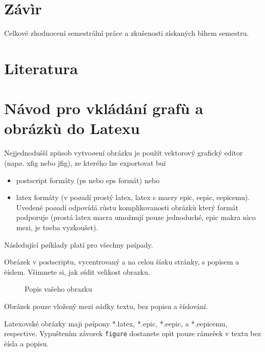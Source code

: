 \documentclass[12pt]{article}
\begin{document}
\section{Závìr}

Celkové zhodnocení semestrální práce a zkušenosti získaných bìhem
semestru.

\section{Literatura}

\appendix

\section{Návod pro vkládání grafù a obrázkù do Latexu}

Nejjednodušší zpùsob vytvoøení obrázku je použít vektorový grafický
editor (napø. xfig nebo jfig), ze kterého lze exportovat buï
\begin{itemize}
\item postscript formáty (ps nebo eps formát) nebo
\item latex formáty (v poøadí prostý latex, latex s macry epic, eepic, eepicemu). Uvedené poøadí odpovídá rùstu
komplikovanosti obrázkù který formát podporuje (prostá latex macra
umožnují pouze jednoduché, epic makra nìco mezi, je tøeba
vyzkoušet).

\end{itemize}
Následující pøíklady platí pro všechny pøípady.

Obrázek v postscriptu, vycentrovaný a na celou šíøku stránky, s
popisem a èíslem. Všimnete si, jak øídit velikost obrazku.
\begin{figure}[ht]
\epsfysize=3cm \centerline{} \caption{Popis
vašeho obrazku} \label{labelvasehoobrazku}
\end{figure}

Obrázek pouze vložený mezi øádky textu, bez popisu a èíslování.\\
\epsfxsize=1cm
\rule{0pt}{0pt}\hfill{}\hfill\rule{0pt}{0pt}

Latexovské obrázky maji pøípony *.latex, *.epic, *.eepic, a
*.eepicemu, respective.
%
Vypuštením závorek {\tt figure} dostanete opìt pouze rámeèek v textu
bez èísla a popisu.
\end{document}
